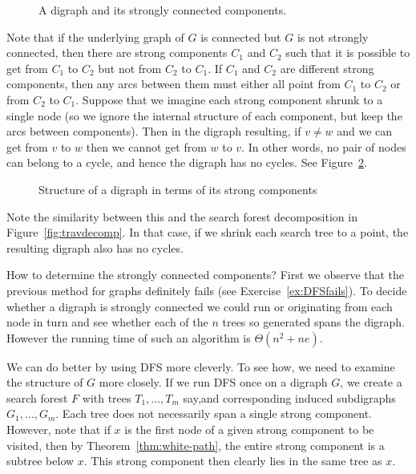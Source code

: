 \begin{figure}[htbp]
\centerline{}

\caption{A digraph and its strongly connected components.}
\label{fig:scc}
\end{figure}

Note that if the underlying graph of $G$ is connected but $G$ is not
strongly connected, then  there are strong components $C_1$ and $C_2$
such that it is possible to get from $C_1$ to $C_2$ but not from $C_2$
to $C_1$. If $C_1$ and $C_2$ are different strong components, then any
arcs between them must either all point from $C_1$ to $C_2$ or from $C_2$
to $C_1$.  Suppose that we imagine each strong component shrunk to a
single node (so we ignore the internal structure of each component,
but keep the arcs between components). Then in the digraph resulting,
if $v\neq w$ and we can get from $v$ to $w$ then we cannot get from
$w$ to $v$. In other words, no pair of nodes can belong to a cycle,
and hence the digraph has no cycles. See Figure~\ref{fig:sccdecomp}.

\begin{figure}[htbp]
\label{fig:sccdecomp}

\caption{Structure of a digraph in terms of its strong components}
\end{figure}

Note the similarity between this and the search forest decomposition in Figure~\ref{fig:travdecomp}. In that case, if we shrink each search tree to a point, the resulting digraph also has no cycles. 

How to determine the strongly connected components? First we observe
that the previous method for graphs definitely fails (see
Exercise~\ref{ex:DFSfails}). To decide whether a digraph is strongly
connected we could run  or 
originating from each node in turn and see whether each of the $n$ trees
so generated spans the digraph. However the running time of such an
algorithm is $\Theta(n^2+ne)$.

We can do better by using DFS more cleverly. To see how, we need to
examine the structure of $G$ more closely. If we run DFS once on a
digraph $G$, we create a search forest $F$ with trees $T_1, \dots ,T_m$
say,and corresponding induced subdigraphs $G_1, \dots , G_m$. Each tree
does not necessarily span a single strong component. However, note that
if $x$ is the first node of a given strong component to be visited,
then by Theorem~\ref{thm:white-path}, the entire strong component is a
subtree below $x$. This strong component then clearly lies in the same
tree as $x$.

